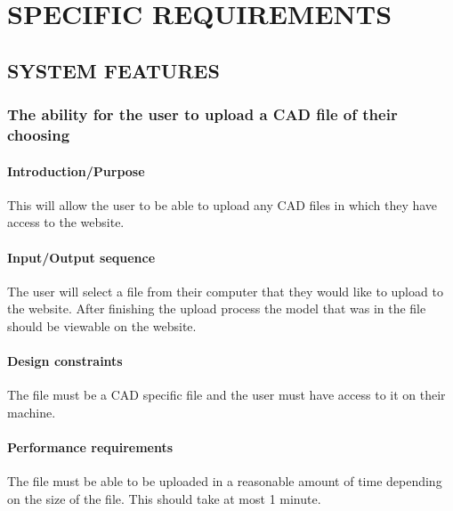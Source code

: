\documentclass[letterpaper, 10pt, draftclsnofoot, compsoc, onecolumn]{IEEEtran}
\begin{document}
\section[SPECIFIC
REQUIREMENTS]{\rmfamily\bfseries\color{black}
SPECIFIC REQUIREMENTS}
\bigskip

\subsection[SYSTEM
FEATURES]{\rmfamily\bfseries\color{black}
SYSTEM FEATURES}
\medskip


\subsubsection[{File Uploading}]{\rmfamily\bfseries\color{black}
	The ability for the user to upload a CAD file of their choosing
}
\smallskip
\paragraph[Introduction/Purpose of this
feature]{ \rmfamily\bfseries\color{black}
Introduction/Purpose }
{\color{black} 
	This will allow the user to be able to upload any CAD files in which they have access to the website.
}

\paragraph[Input/Output sequence:]{\rmfamily\bfseries\color{black}
Input/Output sequence }
{\color{black}
	The user will select a file from their computer that they would like to upload to the website. After finishing the upload process 
	the model that was in the file should be viewable on the website. 
}

\paragraph[Design constraints of this
feature]{\rmfamily\bfseries\color{black} Design
constraints }
{\color{black}
	The file must be a CAD specific file and the user must have access to it on their machine. 
}

\paragraph[Performance requirements of this
feature]{\rmfamily\bfseries\color{black}
Performance requirements }
{\color{black}
	The file must be able to be uploaded in a reasonable amount of time depending on the size of the file. This should take at 
	most 1 minute. 
}
\end{document}
